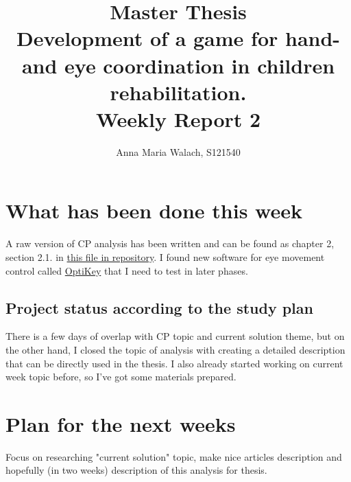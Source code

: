 \documentclass[10pt,a4paper]{article}
\title{{Master Thesis\\[0.5em]}
       {\bf \huge Development of a game for hand- and eye coordination in children rehabilitation.\\[0.5em]}
       {\bf Weekly Report 2}}
\author{Anna Maria Walach, S121540}
\begin{document}
\maketitle

\section*{What has been done this week}
A raw version of CP analysis has been written and can be found as chapter 2, section 2.1. in \href{https://github.com/yahirah/masther-thesis/blob/master/thesis/Thesis.pdf}{this file in repository}. I found new software for eye movement control called \href{https://github.com/JuliusSweetland/OptiKey/wiki}{OptiKey} that I need to test in later phases. 

\subsection*{Project status according to the study plan}
There is a few days of overlap with CP topic and current solution theme, but on the other hand, I closed the topic of analysis with creating a detailed description that can be directly used in the thesis. I also already started working on current week topic before, so I've got some materials prepared. 

\section*{Plan for the next weeks}
Focus on researching "current solution" topic, make nice articles description and hopefully (in two weeks) description of this analysis for thesis. 

 

\end{document}
